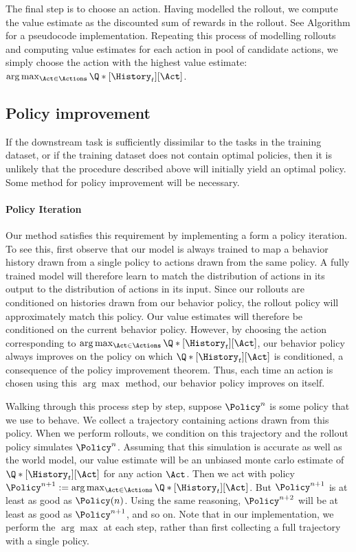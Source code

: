 The final step is to choose an action. Having modelled the rollout, we compute
the value estimate as the discounted sum of rewards in the rollout. See
Algorithm  for a pseudocode implementation. Repeating this
process of modelling rollouts and computing value estimates for each action in
pool of candidate actions, we simply choose the action with the highest value
estimate: $\arg\max_{\Act \in \Actions} \Q*[\History_t][\Act]$.

\subsection{Policy improvement}
If the downstream task is sufficiently dissimilar to the tasks in the training
dataset, or if the training dataset does not contain optimal policies, then it
is unlikely that the procedure described above will initially yield an optimal
policy. Some method for policy improvement will be necessary.

\paragraph{Policy Iteration}
Our method satisfies this requirement by implementing a form a policy iteration.
To see this, first observe that our model is always trained to map a behavior
history drawn from a single policy to actions drawn from the same policy. A
fully trained model will therefore learn to match the distribution of actions in
its output to the distribution of actions in its input. Since our rollouts are
conditioned on histories drawn from our behavior policy, the rollout policy will
approximately match this policy. Our value estimates will therefore be
conditioned on the current behavior policy.  However, by choosing the action
corresponding to $\arg\max_{\Act \in \Actions} \Q*[\History_{t}][\Act]$, our
behavior policy always improves on the policy on which $\Q*[\History_{t}][\Act]$
is conditioned, a consequence of the policy improvement theorem. Thus, each time
an action is chosen using this $\arg\max$ method, our behavior policy improves
on itself.

Walking through this process step by step, suppose $\Policy^n$ is some policy
that we use to behave. We collect a trajectory containing actions drawn from
this policy. When we perform rollouts, we condition on this trajectory and the
rollout policy simulates $\Policy^n$. Assuming that this simulation is accurate
as well as the world model, our value estimate will be an unbiased monte carlo
estimate of $\Q*[\History_{t}][\Act]$ for any action $\Act$. Then we
act with policy $\Policy^{n+1} := \arg\max_{\Act \in \Actions}
    \Q*[\History_{t}][\Act]$. But $\Policy^{n+1}$ is at least as good as
$\Policy(n)$. Using the same reasoning, $\Policy^{n+2}$ will be at least as good
as $\Policy^{n+1}$, and so on. Note that in our implementation, we perform the
$\arg\max$ at each step, rather than first collecting a full trajectory with a
single policy.

